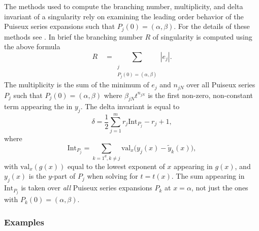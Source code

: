 The methods used to compute the branching number, multiplicity, and
delta invariant of a singularity rely on examining the leading order
behavior of the Puiseux series expansions such that $P_j(0) = (\alpha,
\beta)$. For the details of these methods see
\cite{DeconinckPatterson11}. In brief the branching number $R$ of
singularity is computed using the above formula
\[
    R \quad = \sum_{\substack{j \\ P_j(0)=(\alpha,\beta)}} |e_j|.
\]
The multiplicity is the sum of the minimum of $e_j$ and $n_{jN}$ over
all Puiseux series $P_j$ such that $P_j(0) = (\alpha,\beta)$ where
$\beta_{jN} t ^{n_{jN}}$ is the first non-zero, non-constant term
appearing the in $y_j$. The delta invariant is equal to
\[
    \delta = \frac{1}{2}\sum_{j=1}^m r_j \text{Int}_{P_j} - r_j + 1,
\]
where
\[
    \text{Int}_{P_j} = \sum_{k=1^d, k \neq j}
    \text{val}_x \big( y_j(x) - \tilde{y}_k(x) \big),
\]
with $\text{val}_x( g(x))$ equal to the lowest exponent of $x$ appearing
in $g(x)$, and $y_j(x)$ is the $y$-part of $P_j$ when solving for $t =
t(x)$. The sum appearing in $\text{Int}_{P_j}$ is taken over {\it all}
Puiseux series expansions $P_k$ at $x = \alpha$, not just the ones with
$P_k(0) = (\alpha, \beta)$.



%
\subsubsection*{Examples}
%

